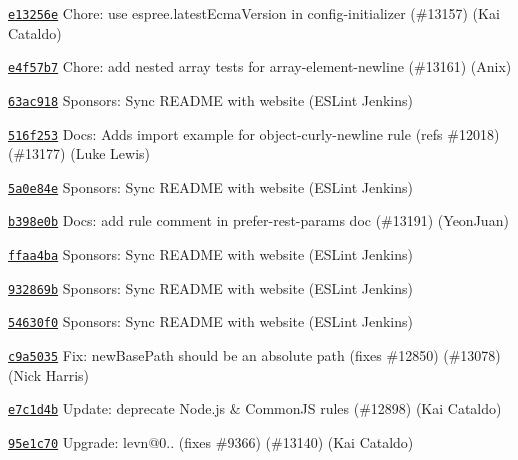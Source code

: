 \begin{DoxyItemize}
\item \href{https://github.com/eslint/eslint/commit/e13256e395cc413ce45a66c8562621d48440d8f4}{\texttt{ {\ttfamily e13256e}}} Chore\+: use espree.\+latest\+Ecma\+Version in config-\/initializer (\#13157) (Kai Cataldo)
\item \href{https://github.com/eslint/eslint/commit/e4f57b7d7b8b7441a2217a217dcda1e7bfff516a}{\texttt{ {\ttfamily e4f57b7}}} Chore\+: add nested array tests for array-\/element-\/newline (\#13161) (Anix)
\item \href{https://github.com/eslint/eslint/commit/63ac91877668205aaa50495a9615806967e6e4cf}{\texttt{ {\ttfamily 63ac918}}} Sponsors\+: Sync README with website (ESLint Jenkins)
\item \href{https://github.com/eslint/eslint/commit/516f253729daeeb9da5de5e9b38606ff9c1aae71}{\texttt{ {\ttfamily 516f253}}} Docs\+: Adds import example for object-\/curly-\/newline rule (refs \#12018) (\#13177) (Luke Lewis)
\item \href{https://github.com/eslint/eslint/commit/5a0e84e9498a946a3e8491a370e012354e087fe0}{\texttt{ {\ttfamily 5a0e84e}}} Sponsors\+: Sync README with website (ESLint Jenkins)
\item \href{https://github.com/eslint/eslint/commit/b398e0b9ff455e4e7d70f19d5ccea5819c21eb86}{\texttt{ {\ttfamily b398e0b}}} Docs\+: add rule comment in prefer-\/rest-\/params doc (\#13191) (Yeon\+Juan)
\item \href{https://github.com/eslint/eslint/commit/ffaa4ba5e2bb1a51a78a2b2c028cbe2efc9e5165}{\texttt{ {\ttfamily ffaa4ba}}} Sponsors\+: Sync README with website (ESLint Jenkins)
\item \href{https://github.com/eslint/eslint/commit/932869b3251b04c4ad5fa72279cb2a56a3e67b55}{\texttt{ {\ttfamily 932869b}}} Sponsors\+: Sync README with website (ESLint Jenkins)
\item \href{https://github.com/eslint/eslint/commit/54630f0063fa66318476473757b5912465d4caf2}{\texttt{ {\ttfamily 54630f0}}} Sponsors\+: Sync README with website (ESLint Jenkins)
\item \href{https://github.com/eslint/eslint/commit/c9a503571a4662f6c2d31cabc7fd7819ec388150}{\texttt{ {\ttfamily c9a5035}}} Fix\+: new\+Base\+Path should be an absolute path (fixes \#12850) (\#13078) (Nick Harris)
\item \href{https://github.com/eslint/eslint/commit/e7c1d4b2ac56149a517d4b0000230348a641f1d3}{\texttt{ {\ttfamily e7c1d4b}}} Update\+: deprecate Node.\+js \& Common\+JS rules (\#12898) (Kai Cataldo)
\item \href{https://github.com/eslint/eslint/commit/95e1c70cebde210a990ee786ec7ab1c8e522edb8}{\texttt{ {\ttfamily 95e1c70}}} Upgrade\+: levn@0.. (fixes \#9366) (\#13140) (Kai Cataldo)

\end{DoxyItemize}
